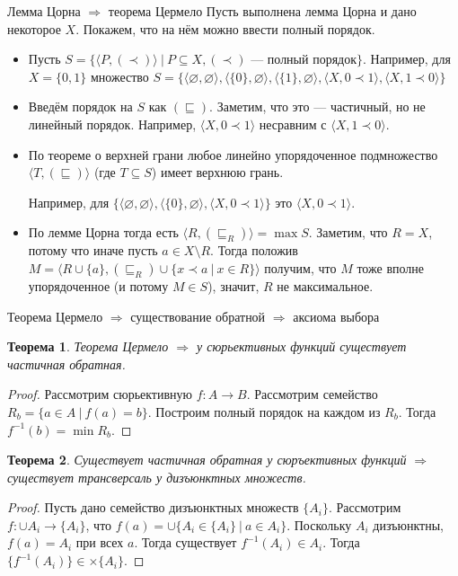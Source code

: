 \documentclass[aspectratio=169]{beamer}
\newtheorem{thm}{Теорема}[section]
\begin{document}
\begin{frame}{Лемма Цорна $\Rightarrow$ теорема Цермело}
Пусть выполнена лемма Цорна и дано некоторое $X$. Покажем, что на нём можно ввести полный порядок.
\begin{itemize}
\item Пусть $S = \{ \langle P, (\prec)\rangle \ |\ P \subseteq X, (\prec)\text{ --- полный порядок} \}$.
{\color{gray}Например, для $X = \{0,1\}$ множество
$S = \{
\langle\varnothing,\varnothing\rangle,
\langle \{0\},\varnothing\rangle,
\langle\{1\},\varnothing\rangle,
\langle X, 0 \prec 1\rangle,
\langle X, 1 \prec 0\rangle
\}$}

\item Введём порядок на $S$ как $(\sqsubseteq)$. Заметим, что это --- частичный, но не линейный порядок. 
{\color{gray}Например, $\langle X, 0 \prec 1\rangle$ несравним с $\langle X, 1 \prec 0\rangle$.}

\item По теореме о верхней грани любое линейно упорядоченное подмножество 
$\langle T, (\sqsubseteq) \rangle$ (где $T \subseteq S$) имеет
верхнюю грань.

{\color{gray}Например, 
для $\{\langle\varnothing,\varnothing\rangle,
\langle \{0\},\varnothing\rangle,
\langle X, 0 \prec 1\rangle\}$ это $\langle X, 0 \prec 1\rangle$.}

\item По лемме Цорна тогда есть $\langle R, (\sqsubseteq_R)\rangle = \max S$. Заметим, что $R = X$, потому что иначе пусть
$a \in X\setminus R$. Тогда положив $M = \langle R\cup\{a\}, (\sqsubseteq_R)\cup\{x\prec a\ |\ x \in R\} \rangle$
получим, что $M$ тоже вполне упорядоченное (и потому $M \in S$), значит, $R$ не максимальное.
\end{itemize}
\end{frame}

\begin{frame}{Теорема Цермело $\Rightarrow$ существование обратной $\Rightarrow$ аксиома выбора}
\begin{thm}Теорема Цермело $\Rightarrow$ у сюрьективных функций существует частичная обратная.\end{thm}
\begin{proof}
Рассмотрим сюрьективную $f: A \rightarrow B$. Рассмотрим семейство $R_b = \{ a \in A\ |\ f(a) = b \}$.
Построим полный порядок на каждом из $R_b$. Тогда $f^{-1}(b) = \min R_b$.
\end{proof}
\begin{thm}Существует частичная обратная у сюръективных функций $\Rightarrow$ существует трансверсаль у дизъюнктных множеств.\end{thm}
\begin{proof}
Пусть дано семейство дизъюнктных множеств $\{ A_i \}$. 
Рассмотрим $f: \cup A_i \rightarrow \{A_i\}$, что
$f(a) = \cup\{ A_i \in \{ A_i \}\ |\ a \in A_i \}$. Поскольку $A_i$ дизъюнктны,
$f(a) = A_i$ при всех $a$. Тогда существует $f^{-1}(A_i) \in A_i$. Тогда $\{ f^{-1}(A_i) \} \in \times \{A_i\}$.
\end{proof}
\end{frame}
\end{document}
